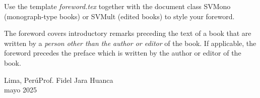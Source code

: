 %
%

\foreword

Use the template \textit{foreword.tex} together with the document class SVMono (monograph-type books) or SVMult (edited books) to style your foreword.

The foreword covers introductory remarks preceding the text of a book that are written by a \textit{person other than the author or editor} of the book. If applicable, the foreword precedes the preface which is written by the author or editor of the book.

\vspace{\baselineskip}
\begin{flushright}\noindent
    Lima, Perú\hfill Prof. Fidel Jara Huanca\\
    mayo 2025\hfill {\it\phantom{.}}
\end{flushright}


